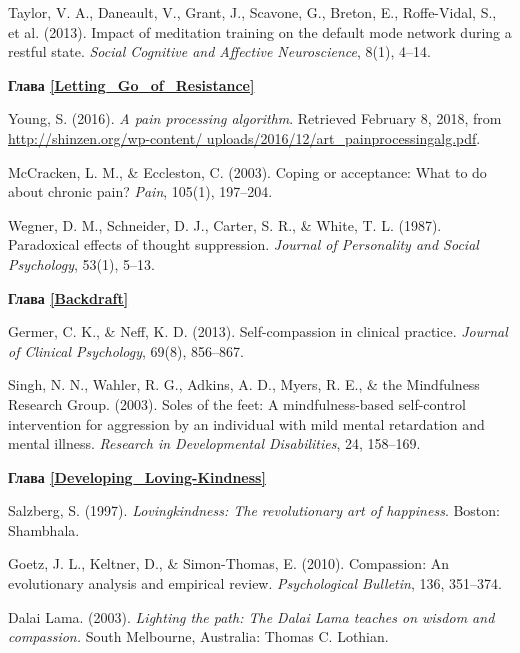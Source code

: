 \begin{thebibliography}{999}
	 Taylor, V. A., Daneault, V., Grant, J., Scavone, G., Breton, E., Roffe-Vidal, S., et al. (2013). Impact of meditation training on the default mode network during a restful state. \textit{Social Cognitive and Affective Neuroscience}, 8(1), 4–14.
	 
	 
	\vspace{3ex}
	\textbf{Глава \ref{Letting_Go_of_Resistance}}
	
	 Young, S. (2016). \textit{A pain processing algorithm}. Retrieved February 8, 2018, from \url{http://shinzen.org/wp-content/ uploads/2016/12/art_painprocessingalg.pdf}.
	
	 McCracken, L. M., \& Eccleston, C. (2003). Coping or acceptance: What to do about chronic pain? \textit{Pain}, 105(1), 197–204.
	
	 Wegner, D. M., Schneider, D. J., Carter, S. R., \& White, T. L. (1987). Paradoxical effects of thought suppression. \textit{Journal of Personality and Social Psychology}, 53(1), 5–13.
	
	
	\vspace{3ex}
	\textbf{Глава \ref{Backdraft}}
	
	 Germer, C. K., \& Neff, K. D. (2013). Self-compassion in clinical practice. \textit{Journal of Clinical Psychology}, 69(8), 856–867.
	
	 Singh, N. N., Wahler, R. G., Adkins, A. D., Myers, R. E., \& the Mindfulness Research Group. (2003). Soles of the feet: A mindfulness-based self-control intervention for aggression by an individual with mild mental retardation and mental illness. \textit{Research in Developmental Disabilities}, 24, 158–169.
	
	
	\vspace{3ex}
	\textbf{Глава \ref{Developing_Loving-Kindness}}
	
	 Salzberg, S. (1997). \textit{Lovingkindness: The revolutionary art of happiness}. Boston: Shambhala.
	
	 Goetz, J. L., Keltner, D., \& Simon-Thomas, E. (2010). Compassion: An evolutionary analysis and empirical review. \textit{Psychological Bulletin}, 136, 351–374.
	
	 Dalai Lama. (2003). \textit{Lighting the path: The Dalai Lama teaches on wisdom and compassion.} South Melbourne, Australia: Thomas C. Lothian.
	

\end{thebibliography}
